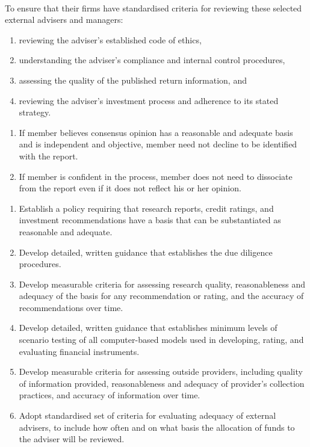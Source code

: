 \begin{remark} \\
To ensure that their firms have standardised criteria for reviewing these selected external advisers and managers:
\begin{enumerate}[label=\roman*.]
\setlength{\itemsep}{0pt}
\item reviewing the adviser’s established code of ethics,
\item understanding the adviser’s compliance and internal control procedures,
\item assessing the quality of the published return information, and
\item reviewing the adviser’s investment process and adherence to its stated strategy.
\end{enumerate}
\end{remark}

\begin{remark} 
\begin{enumerate}[label=\roman*.]
\setlength{\itemsep}{0pt}
\item If member believes consensus opinion has a reasonable and adequate basis and is independent and objective, member need not decline to be identified with the report. 
\item If member is confident in the process, member does not need to dissociate from the report even if it does not reflect his or her opinion.
\end{enumerate}
\end{remark}

\begin{remark} 
\begin{enumerate}[label=\roman*.]
\setlength{\itemsep}{0pt}
\item Establish a policy requiring that research reports, credit ratings, and investment recommendations have a basis that can be substantiated as reasonable and adequate.
\item Develop detailed, written guidance that establishes the due diligence procedures.
\item Develop measurable criteria for assessing research quality, reasonableness and adequacy of the basis for any recommendation or rating, and the accuracy of recommendations over time.
\item Develop detailed, written guidance that establishes minimum levels of scenario testing of all computer-based models used in developing, rating, and evaluating financial instruments. 
\item Develop measurable criteria for assessing outside providers, including quality of information provided, reasonableness and adequacy of provider’s collection practices, and accuracy of information over time.
\item Adopt standardised set of criteria for evaluating adequacy of external advisers, to include how often and on what basis the allocation of funds to the adviser will be reviewed.
\end{enumerate}
\end{remark}

